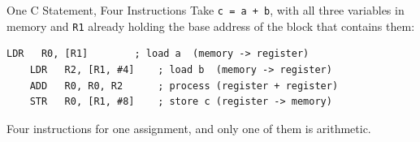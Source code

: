 \documentclass[9pt,aspectratio=169,xcolor=table]{beamer}
\begin{document}
\begin{frame}[fragile]{One C Statement, Four Instructions}
    \leavevmode
    {\small Take \texttt{c = a + b}, with all three variables in memory and
    \texttt{R1} already holding the base address of the block that contains
    them:}

    \vspace{2mm}
    \begin{center}
    \begin{lstlisting}[style=armasm, language=ARM, basicstyle=\footnotesize\ttfamily]
	LDR   R0, [R1]        ; load a  (memory -> register)
	LDR   R2, [R1, #4]    ; load b  (memory -> register)
	ADD   R0, R0, R2      ; process (register + register)
	STR   R0, [R1, #8]    ; store c (register -> memory)
    \end{lstlisting}
    \end{center}

    \vspace{2mm}
    {\small Four instructions for one assignment, and only one of them
    is arithmetic.}
\end{frame}
\end{document}
